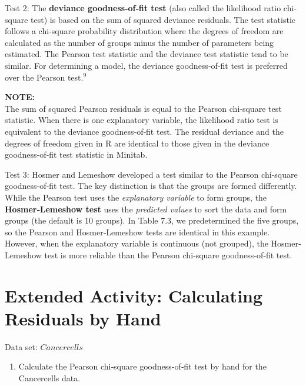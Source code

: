 \documentclass[
]{report}
\providecommand{\tightlist}{%
  \setlength{\itemsep}{0pt}\setlength{\parskip}{0pt}}
\begin{document}
Test 2: The \textbf{deviance goodness‐of‐fit test} (also called the likelihood ratio chi‐square test) is based on the sum of squared deviance residuals. The test statistic follows a chi‐square probability distribution where the degrees of freedom are calculated as the number of groups minus the number of parameters being estimated. The Pearson test statistic and the deviance test statistic tend to be similar. For determining a model, the deviance goodness‐of‐fit test is preferred over the Pearson test.\(^9\)

\large

\textbf{NOTE:}\\
The sum of squared Pearson residuals is equal to the Pearson chi‐square test statistic. When there is one explanatory variable, the likelihood ratio test is equivalent to the deviance goodness‐of‐fit test. The residual deviance and the degrees of freedom given in R are identical to those given in the deviance goodness‐of‐fit test statistic in Minitab.\\
\normalsize

Test 3: Hosmer and Lemeshow developed a test similar to the Pearson chi‐square goodness‐of‐fit test. The key distinction is that the groups are formed differently. While the Pearson test uses the \emph{explanatory variable} to form groups, the \textbf{Hosmer‐Lemeshow test} uses the \emph{predicted values} to sort the data and form groups (the default is 10 groups). In Table 7.3, we predetermined the five groups, so the Pearson and Hosmer‐Lemeshow tests are identical in this example. However, when the explanatory variable is continuous (not grouped), the Hosmer‐Lemeshow test is more reliable than the Pearson chi‐square goodness‐of‐fit test.

\section*{Extended Activity: Calculating Residuals by Hand}\label{extended-activity-calculating-residuals-by-hand}

Data set: \(Cancercells\)

\begin{enumerate}
\def\labelenumi{\arabic{enumi}.}
\setcounter{enumi}{28}
\tightlist
\item
  Calculate the Pearson chi‐square goodness‐of‐fit test by hand for the Cancercells data.\\
\end{enumerate}
\end{document}
